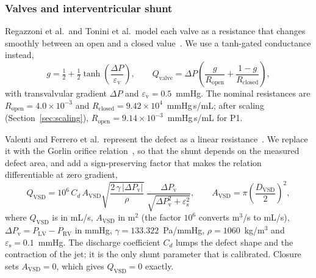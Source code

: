 \documentclass{article}
\begin{document}
\FloatBarrier
\subsubsection{Valves and interventricular shunt}
\label{sec:valves}
Regazzoni et al.\ and Tonini et al.\ model each valve as a resistance that changes smoothly between an open and a closed value~\cite{Regazzoni2022,Tonini2025}. We use a tanh-gated conductance instead,
\begin{equation}
g = \tfrac{1}{2} + \tfrac{1}{2}\tanh\!\left(\frac{\Delta P}{\varepsilon_{\mathrm{v}}}\right), \qquad
Q_{\mathrm{valve}} = \Delta P\left(\frac{g}{R_{\mathrm{open}}} + \frac{1-g}{R_{\mathrm{closed}}}\right),
\label{eq:valve}
\end{equation}
with transvalvular gradient $\Delta P$ and $\varepsilon_{\mathrm{v}} = 0.5$~mmHg. The nominal resistances are $R_{\mathrm{open}} = 4.0\times10^{-3}$ and $R_{\mathrm{closed}} = 9.42\times10^{4}$~mmHg\,s/mL; after scaling (Section~\ref{sec:scaling}), $R_{\mathrm{open}} = 9.14\times10^{-3}$~mmHg\,s/mL for P1.

Valenti and Ferrero et al.\ represent the defect as a linear resistance~\cite{Valenti2023,Ferrero2026Shunts}. We replace it with the Gorlin orifice relation~\cite{Gorlin1951}, so that the shunt depends on the measured defect area, and add a sign-preserving factor that makes the relation differentiable at zero gradient,
\begin{equation}
Q_{\mathrm{VSD}} = 10^{6}\, C_d\, A_{\mathrm{VSD}} \sqrt{\frac{2\,\gamma\,\lvert\Delta P_{\mathrm{v}}\rvert}{\rho}}\;
\frac{\Delta P_{\mathrm{v}}}{\sqrt{\Delta P_{\mathrm{v}}^{2} + \varepsilon_{\mathrm{s}}^{2}}},
\qquad A_{\mathrm{VSD}} = \pi\left(\frac{D_{\mathrm{VSD}}}{2}\right)^{2},
\label{eq:orifice}
\end{equation}
where $Q_{\mathrm{VSD}}$ is in mL/s, $A_{\mathrm{VSD}}$ in m$^2$ (the factor $10^{6}$ converts m$^3$/s to mL/s), $\Delta P_{\mathrm{v}} = P_{\mathrm{LV}} - P_{\mathrm{RV}}$ in mmHg, $\gamma = 133.322$~Pa/mmHg, $\rho = 1060$~kg/m$^3$ and $\varepsilon_{\mathrm{s}} = 0.1$~mmHg. The discharge coefficient $C_d$ lumps the defect shape and the contraction of the jet; it is the only shunt parameter that is calibrated. Closure sets $A_{\mathrm{VSD}} = 0$, which gives $Q_{\mathrm{VSD}} = 0$ exactly.
\end{document}
